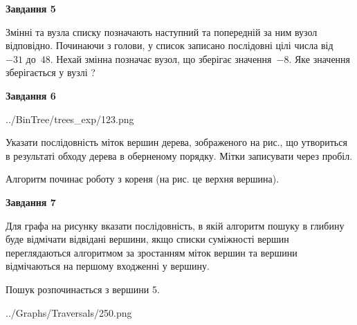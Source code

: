 \documentclass[12pt, ukrainian]{article}
\begin{document}
{\begin {large}
{\begin {center}\textbf{Завдання 5}\end {center}}\par
Змінні  та  вузла списку позначають наступний та попередній за ним вузол відповідно. Починаючи з голови, у список записано послідовні цілі числа від~$-31$ до~$48$. Нехай змінна  позначає вузол, що зберігає значення~$-8$.
Яке значення зберігається у вузлі  ?\par
\newpage

{\begin {center}\textbf{Завдання 6}\end {center}}\par

\begin{center}
	{../BinTree/trees_exp/123.png}
\end{center}
Указати послідовність міток вершин дерева, зображеного на рис., що утвориться в результаті обходу дерева в оберненому порядку. Мітки записувати через пробіл.\par Алгоритм починає роботу з кореня (на рис. це верхня вершина).\par
\newpage

{\begin {center}\textbf{Завдання 7}\end {center}}\par
Для графа на рисунку вказати послідовність, в якій алгоритм пошуку в глибину буде відмічати відвідані вершини, якщо списки суміжності вершин переглядаються алгоритмом за зростанням міток вершин та вершини відмічаються на першому вход\-женні у вершину.\par
Пошук розпочинається з вершини 5.\par

\begin{center}
	{../Graphs/Traversals/250.png}
\end{center}\par
\newpage


\end{large}}
\end{document}
